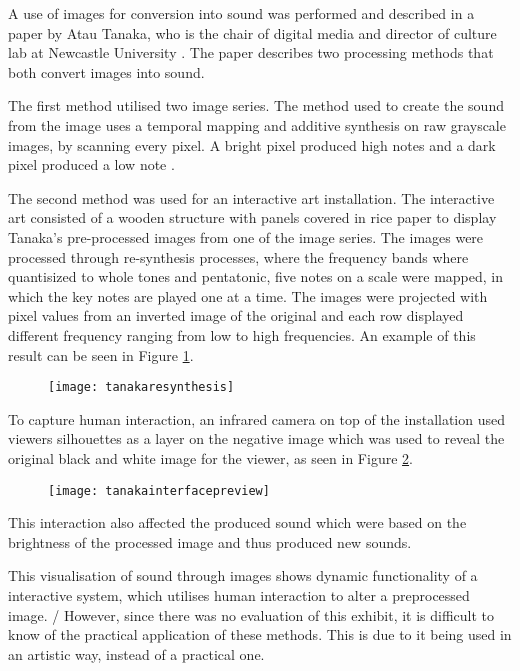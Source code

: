 A use of images for conversion into sound was performed and described in a paper by Atau Tanaka, who is the chair of digital media and director of culture lab at Newcastle University \cite{Tanaka2012}. The paper describes two processing methods that both convert images into sound.

The first method utilised two image series. The method used to create the sound from the image uses a temporal mapping and additive synthesis on raw grayscale images, by scanning every pixel. A bright pixel produced high notes and a dark pixel produced a low note \cite{Tanaka2012}.

The second method was used for an interactive art installation. The interactive art consisted of a wooden structure with panels covered in rice paper to display Tanaka's pre-processed images from one of the image series. The images were processed through re-synthesis processes, where the frequency bands where quantisized to whole tones and pentatonic, five notes on a scale were mapped, in which the key notes are played one at a time. The images were projected with pixel values from an inverted image of the original and each row displayed different frequency ranging from low to high frequencies. An example of this result can be seen in Figure \ref{fig:tanakaresynthesis}.  

\begin{figure}[!h]
\centering
\texttt{[image: tanakaresynthesis]}
\caption{\label{fig:tanakaresynthesis}\cite{Tanaka2012}}
\end{figure}

To capture human interaction, an infrared camera on top of the installation used viewers silhouettes as a layer on the negative image which was used to reveal the original black and white image for the viewer, as seen in Figure \ref{fig:tanakainterfacepreview}.

\begin{figure}[!h]
\centering
\texttt{[image: tanakainterfacepreview]}
\caption{\label{fig:tanakainterfacepreview}\cite{Tanaka2012}}
\end{figure}

This interaction also affected the produced sound which were based on the brightness of the processed image and thus produced new sounds. 

This visualisation of sound through images shows dynamic functionality of a interactive system, which utilises human interaction to alter a preprocessed image. / However, since there was no evaluation of this exhibit, it is difficult to know of the practical application of these methods. This is due to it being used in an artistic way, instead of a practical one.

